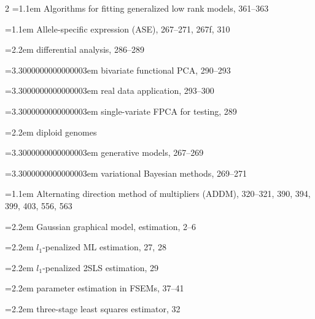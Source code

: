 \begin{multicols}{2}
\noindent\hangindent=1.1em Algorithms for fitting generalized low rank models, 361--363\par
\noindent\hangindent=1.1em Allele-specific expression (ASE), 267--271, 267f, 310\par
\noindent\hangindent=2.2em \hspace*{1.1em}differential analysis, 286--289\par
\noindent\hangindent=3.3000000000000003em \hspace*{2.2em}bivariate functional PCA, 290--293\par
\noindent\hangindent=3.3000000000000003em \hspace*{2.2em}real data application, 293--300\par
\noindent\hangindent=3.3000000000000003em \hspace*{2.2em}single-variate FPCA for testing, 289\par
\noindent\hangindent=2.2em \hspace*{1.1em}diploid genomes\par
\noindent\hangindent=3.3000000000000003em \hspace*{2.2em}generative models, 267--269\par
\noindent\hangindent=3.3000000000000003em \hspace*{2.2em}variational Bayesian methods, 269--271\par
\noindent\hangindent=1.1em Alternating direction method of multipliers (ADDM), 320--321, 390, 394, 399, 403, 556, 563\par
\noindent\hangindent=2.2em \hspace*{1.1em}Gaussian graphical model, estimation, 2--6\par
\noindent\hangindent=2.2em \hspace*{1.1em}$l_{1}$-penalized ML estimation, 27, 28\par
\noindent\hangindent=2.2em \hspace*{1.1em}$l_{1}$-penalized 2SLS estimation, 29\par
\noindent\hangindent=2.2em \hspace*{1.1em}parameter estimation in FSEMs, 37--41\par
\noindent\hangindent=2.2em \hspace*{1.1em}three-stage least squares estimator, 32\par

\end{multicols}
